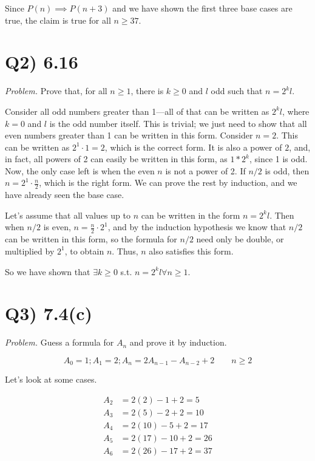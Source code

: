 \documentclass{article}
\begin{document}
\smallskip

Since $P(n) \implies P(n+3)$ and we have shown the first three base cases are true, the claim is true for all $n \geq 37$. 




\section*{Q2) 6.16}
\textit{Problem.} Prove that, for all $n \geq 1$, there is $k \geq 0$ and $l$ odd such that $n = 2^k l$.


Consider all odd numbers greater than 1---all of that can be written as $2^k l$, where $k = 0$ and $l$ is the odd number itself. This is trivial; we just need to show that all even numbers greater than 1 can be written in this form. Consider $n = 2$. This can be written as $2^1 \cdot 1 = 2$, which is the correct form. It is also a power of $2$, and, in fact, all powers of 2 can easily be written in this form, as $1*2^k$, since 1 is odd. Now, the only case left is when the even $n$ is not a power of 2. If $n/2$ is odd, then $n = 2^1 \cdot \frac{n}{2}$, which is the right form. We can prove the rest by induction, and we have already seen the base case.

Let's assume that all values up to $n$ can be written in the form $n = 2^k l$. Then when $n/2$ is even, $n = \frac{n}{2} \cdot 2^1$, and by the induction hypothesis we know that $n/2$ can be written in this form, so the formula for $n/2$ need only be double, or multiplied by $2^1$, to obtain $n$. Thus, $n$ also satisfies this form.

So we have shown that $\exists k \geq 0$ s.t. $n = 2^k l \forall n \geq 1$.


\section*{Q3) 7.4(c)}
\textit{Problem.} Guess a formula for $A_n$ and prove it by induction.

$$A_0 = 1; A_1 = 2; A_n = 2A_{n-1} - A_{n-2} + 2 \qquad n\geq 2$$

Let's look at some cases.

\begin{align*}
  A_2 &= 2(2) - 1 + 2 = 5 \\
  A_3 &= 2(5) - 2 + 2 = 10 \\
  A_4 &= 2(10) - 5 + 2 = 17 \\
  A_5 &= 2(17) - 10 + 2 = 26 \\
  A_6 &= 2(26) - 17 + 2 = 37
\end{align*}
\end{document}
